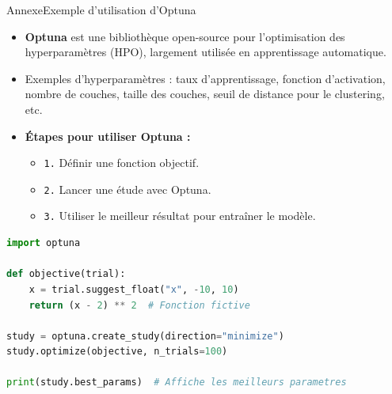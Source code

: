 \begin{frame}[fragile]{Annexe}{Exemple d’utilisation d’Optuna}
    \begin{itemize}
        \item \textbf{Optuna} est une bibliothèque open-source pour l’optimisation des hyperparamètres (HPO), largement utilisée en apprentissage automatique.
        \item Exemples d’hyperparamètres : taux d’apprentissage, fonction d’activation, nombre de couches, taille des couches, seuil de distance pour le clustering, etc.
        \item \textbf{Étapes pour utiliser Optuna :}
              \begin{itemize}
                  \item \texttt{1.} Définir une fonction objectif.
                  \item \texttt{2.} Lancer une étude avec Optuna.
                  \item \texttt{3.} Utiliser le meilleur résultat pour entraîner le modèle.
              \end{itemize}
    \end{itemize}

    \begin{lstlisting}[language=Python, basicstyle=\small\ttfamily, frame=single, caption=Exemple d'utilisation d'Optuna en Python]
import optuna

def objective(trial):
    x = trial.suggest_float("x", -10, 10)
    return (x - 2) ** 2  # Fonction fictive

study = optuna.create_study(direction="minimize")
study.optimize(objective, n_trials=100)

print(study.best_params)  # Affiche les meilleurs parametres
    \end{lstlisting}
\end{frame}


